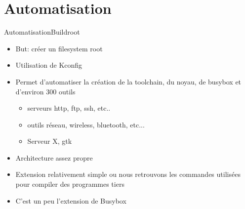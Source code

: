 




\section{Automatisation}

\begin{frame}[fragile=singleslide]{Automatisation}{Buildroot}
  \begin{itemize}
  \item But: créer un filesystem root
  \item Utilisation de Kconfig
  \item Permet d'automatiser la création  de la toolchain, du noyau,
    de busybox et d'environ 300 outils
    \begin{itemize}
    \item serveurs http, ftp, ssh, etc..
    \item outils réseau, wireless, bluetooth, etc...
    \item Serveur X, gtk
    \end{itemize}
  \item Architecture assez propre
  \item Extension relativement simple ou nous retrouvons les commandes
    utilisées pour compiler des programmes tiers
  \item C'est un peu l'extension de Busybox
  \end{itemize}
\end{frame}

